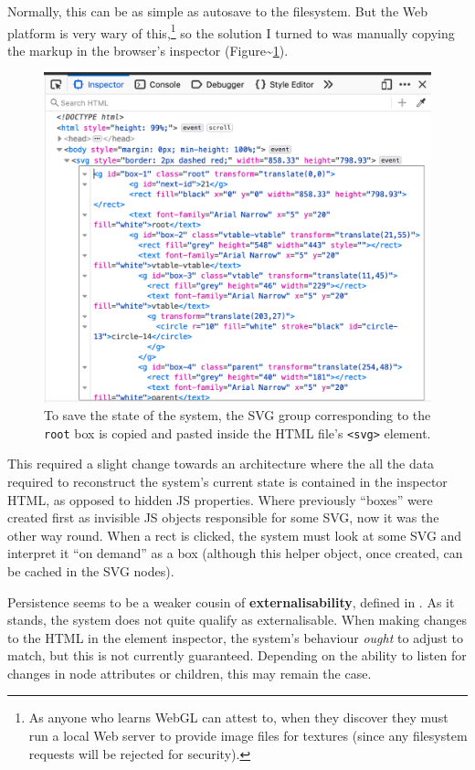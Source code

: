 Normally, this can be as simple as autosave to the filesystem. But the
Web platform is very wary of this,\footnote{As anyone who learns WebGL
  can attest to, when they discover they must run a local Web server to
  provide image files for textures (since any filesystem requests will
  be rejected for security).} so the solution I turned to was manually
copying the markup in the browser's inspector
(Figure\textasciitilde{}\ref{fig:html-inspector}).

\begin{figure}
  \centering
  \includegraphics[width=\linewidth]{../html-inspector.png}
  \caption{To save the state of the system, the SVG group corresponding to the \texttt{root} box is copied and pasted inside the HTML file's \texttt{\textless{}svg\textgreater{}} element.\label{fig:html-inspector}}
\end{figure}

This required a slight change towards an architecture where the all the
data required to reconstruct the system's current state is contained in
the inspector HTML, as opposed to hidden JS properties. Where previously
``boxes'' were created first as invisible JS objects responsible for
some SVG, now it was the other way round. When a rect is clicked, the
system must look at some SVG and interpret it ``on demand'' as a box
(although this helper object, once created, can be cached in the SVG
nodes).

Persistence seems to be a weaker cousin of \textbf{externalisability},
defined in \cite{externalise}. As it stands, the system does not quite
qualify as externalisable. When making changes to the HTML in the
element inspector, the system's behaviour \emph{ought} to adjust to
match, but this is not currently guaranteed. Depending on the ability to
listen for changes in node attributes or children, this may remain the
case.


